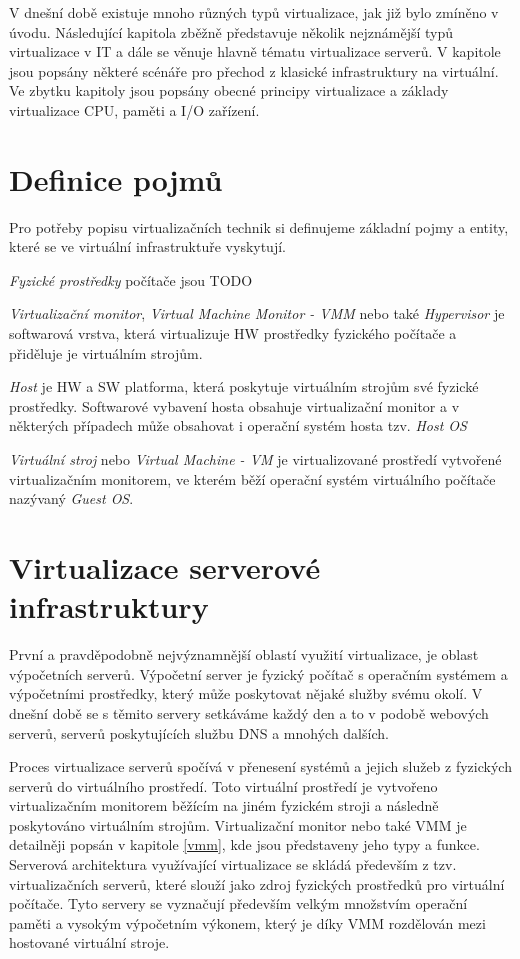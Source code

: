 V dnešní době existuje mnoho různých typů virtualizace, jak již bylo zmíněno v úvodu. Následující kapitola zběžně představuje několik nejznámější typů virtualizace v IT a dále se věnuje hlavně
tématu virtualizace serverů. V kapitole jsou popsány některé scénáře pro přechod z klasické infrastruktury na virtuální. Ve zbytku kapitoly jsou popsány obecné principy virtualizace a základy 
virtualizace CPU, paměti a I/O zařízení.

\section{Definice pojmů}
Pro potřeby popisu virtualizačních technik si definujeme základní pojmy a entity, které se ve virtuální infrastruktuře vyskytují.

\textit{Fyzické prostředky} počítače jsou TODO

\textit{Virtualizační monitor}, \textit{Virtual Machine Monitor - VMM} nebo také \textit{Hypervisor} je softwarová vrstva, která virtualizuje HW prostředky fyzického počítače a přiděluje je
virtuálním strojům.

\textit{Host} je HW a SW platforma, která poskytuje virtuálním strojům své fyzické prostředky. Softwarové vybavení hosta obsahuje virtualizační
monitor a v některých případech může obsahovat i operační systém hosta tzv. \textit{Host OS}

\textit{Virtuální stroj} nebo \textit{Virtual Machine - VM} je virtualizované prostředí vytvořené virtualizačním monitorem, ve kterém běží operační systém virtuálního počítače nazývaný \textit{Guest OS}.

\section{Virtualizace serverové infrastruktury}

První a pravděpodobně nejvýznamnější oblastí využití virtualizace, je oblast výpočetních serverů. Výpočetní server je fyzický počítač s operačním systémem a výpočetními prostředky, který může poskytovat nějaké služby svému okolí.
V dnešní době se s těmito servery setkáváme každý den a to v podobě webových serverů, serverů poskytujících službu DNS a mnohých dalších.

Proces virtualizace serverů spočívá v přenesení systémů a jejich služeb z fyzických serverů do virtuálního prostředí. Toto virtuální prostředí je vytvořeno virtualizačním monitorem běžícím na jiném fyzickém stroji a následně poskytováno virtuálním strojům.
Virtualizační monitor nebo také VMM je detailněji popsán v kapitole \ref{vmm}, kde jsou představeny jeho typy a funkce. Serverová architektura využívající virtualizace se skládá především z tzv. virtualizačních serverů, které slouží jako zdroj fyzických
prostředků pro virtuální počítače. Tyto servery se vyznačují především velkým množstvím operační paměti a vysokým výpočetním výkonem, který je díky VMM rozdělován mezi hostované virtuální stroje.


